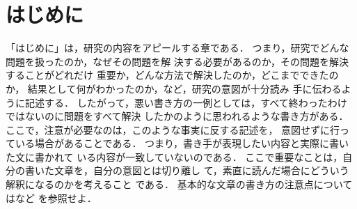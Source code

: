 \documentclass[11pt,master]{oecu-thesis}
\begin{document}
\begin{abstract}

\end{abstract}

\newpage

\tableofcontents
\cleardoublepage

\setcounter{page}{1}

\chapter{はじめに}\label{chap:intro}

「はじめに」は，研究の内容をアピールする章である．
つまり，研究でどんな問題を扱ったのか，なぜその問題を解
決する必要があるのか，その問題を解決することがどれだけ
重要か，どんな方法で解決したのか，どこまでできたのか，
結果として何がわかったのか，など，研究の意図が十分読み
手に伝わるように記述する．
したがって，悪い書き方の一例としては，すべて終わったわけではないのに問題をすべて解決
したかのように思われるような書き方がある．
ここで，注意が必要なのは，このような事実に反する記述を，
意図せずに行っている場合があることである．
つまり，書き手が表現したい内容と実際に書いた文に書かれて
いる内容が一致していないのである．
ここで重要なことは，自分の書いた文章を，自分の意図とは切り離し
て，素直に読んだ場合にどういう解釈になるのかを考えること
である．
基本的な文章の書き方の注意点については\cite{sakubun}など
を参照せよ．
\end{document}
